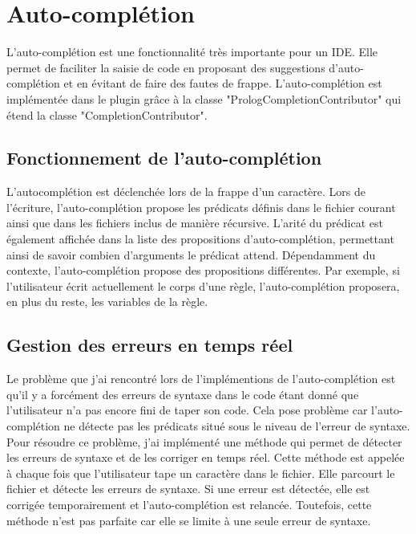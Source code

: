 

\section{Auto-complétion}
\noindent L'auto-complétion est une fonctionnalité très importante pour un IDE. Elle permet de faciliter la saisie de code en proposant des suggestions d'auto-complétion et en évitant de faire des fautes de frappe.
\newdoubleline L'auto-complétion est implémentée dans le plugin grâce à la classe "PrologCompletionContributor" qui étend la classe "CompletionContributor".

\subsection{Fonctionnement de l'auto-complétion}
\noindent L'autocomplétion est déclenchée lors de la frappe d'un caractère. Lors de l'écriture, l'auto-complétion propose les prédicats définis dans le fichier courant ainsi que dans les fichiers inclus de manière récursive.
L'arité du prédicat est également affichée dans la liste des propositions d'auto-complétion, permettant ainsi de savoir combien d'arguments le prédicat attend.
\newdoubleline Dépendamment du contexte, l'auto-complétion propose des propositions différentes. Par exemple, si l'utilisateur écrit actuellement le corps d'une règle, l'auto-complétion proposera, en plus du reste, les variables de la règle.

\subsection{Gestion des erreurs en temps réel}
\noindent Le problème que j'ai rencontré lors de l'implémentions de l'auto-complétion est qu'il y a forcément des erreurs
de syntaxe dans le code étant donné que l'utilisateur n'a pas encore fini de taper son code. Cela pose problème car
l'auto-complétion ne détecte pas les prédicats situé sous le niveau de l'erreur de syntaxe.
\newdoubleline Pour résoudre ce problème,
j'ai implémenté une méthode qui permet de détecter les erreurs de syntaxe et de les corriger en temps réel.
Cette méthode est appelée à chaque fois que l'utilisateur tape un caractère dans le fichier. Elle parcourt le fichier et
détecte les erreurs de syntaxe. Si une erreur est détectée, elle est corrigée temporairement et l'auto-complétion est relancée.
\newdoubleline Toutefois, cette méthode n'est pas parfaite car elle se limite à une seule erreur de syntaxe.

